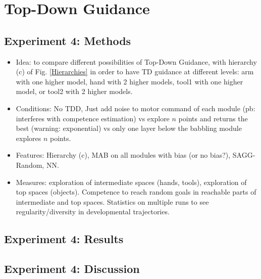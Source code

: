 \documentclass[conference]{include/IEEEtran}
\begin{document}
%
	
\section{Top-Down Guidance}


	\subsection{Experiment 4: Methods}	
		
		\begin{itemize}
			\item Idea: to compare different possibilities of Top-Down Guidance, with hierarchy (c) of Fig. \ref{Hierarchies} in order to have TD guidance at different levels: 
					arm with one higher model, hand with 2 higher models, tool1 with one higher model, or tool2 with 2 higher models.
			
			\item Conditions: No TDD, Just add noise to motor command of each module (pb: interferes with competence estimation) 
					vs explore $n$ points and returns the best (warning: exponential)
					vs only one layer below the babbling module explores $n$ points.
			
			\item Features: Hierarchy (c), MAB on all modules with bias (or no bias?), SAGG-Random, NN.
			
			\item Measures: exploration of intermediate spaces (hands, tools), exploration of top spaces (objects). Competence to reach random goals in reachable parts of intermediate and top spaces. 
					Statistics on multiple runs to see regularity/diversity in developmental trajectories.
		\end{itemize}
		
		
	\subsection{Experiment 4: Results}
	
		
	
	\subsection{Experiment 4: Discussion}	
	
\end{document}
